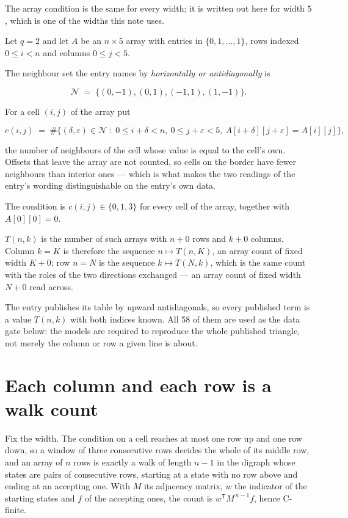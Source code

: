 \documentclass[11pt]{article}
\theoremstyle{definition}
\begin{document}
The array condition is the same for every width; it is written out here for width $5$, which is one of the widths this note uses.

Let $q = 2$ and let $A$ be an $n \times 5$ array with entries in $\{0,1,\dots,1\}$, rows indexed $0 \le i < n$ and columns $0 \le j < 5$.

The neighbour set the entry names by {\itshape horizontally or antidiagonally} is

\[\mathcal{N} \;=\; \{(0,-1), (0,1), (-1,1), (1,-1)\}.\]

For a cell $(i,j)$ of the array put

\[c(i,j) \;=\; \#\bigl\{(\delta,\varepsilon)\in\mathcal{N} \;:\; 0\le i+\delta<n,\ 0\le j+\varepsilon<5,\ A[i+\delta][j+\varepsilon] = A[i][j]\bigr\},\]

the number of neighbours of the cell whose value is equal to the cell's own. Offsets that leave the array are not counted, so cells on the border have fewer neighbours than interior ones --- which is what makes the two readings of the entry's wording distinguishable on the entry's own data.

The condition is $c(i,j) \in \{0, 1, 3\}$ for every cell of the array, together with $A[0][0]=0$.

$T(n,k)$ is the number of such arrays with $n + 0$ rows and $k + 0$ columns. Column $k = K$ is therefore the sequence $n \mapsto T(n,K)$, an array count of fixed width $K + 0$; row $n = N$ is the sequence $k \mapsto T(N,k)$, which is the same count with the roles of the two directions exchanged --- an array count of fixed width $N + 0$ read across.

The entry publishes its table by upward antidiagonals, so every published term is a value $T(n,k)$ with both indices known. All 58 of them are used as the data gate below: the models are required to reproduce the whole published triangle, not merely the column or row a given line is about.

\section{Each column and each row is a walk count}

Fix the width. The condition on a cell reaches at most one row up and one row down, so a window of three consecutive rows decides the whole of its middle row, and an array of $n$ rows is exactly a walk of length $n-1$ in the digraph whose states are pairs of consecutive rows, starting at a state with no row above and ending at an accepting one. With $M$ its adjacency matrix, $w$ the indicator of the starting states and $f$ of the accepting ones, the count is $w^{\mathsf T}M^{\,n-1}f$, hence C-finite.
\end{document}
